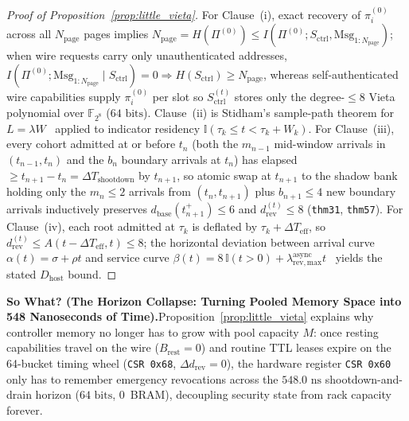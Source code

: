 \documentclass[11pt,letterpaper]{article}
\providecommand{\CoreBRAM}{0}
\theoremstyle{spectralthm}
\begin{document}
\begin{proof}[Proof of Proposition~\ref{prop:little_vieta}]
For Clause~(i), exact recovery of $\pi^{(0)}_i$ across all $N_{\mathrm{page}}$ pages implies $N_{\mathrm{page}} = H(\Pi^{(0)}) \allowbreak\le I(\Pi^{(0)};\allowbreak S_{\mathrm{ctrl}}, \mathrm{Msg}_{1:N_{\mathrm{page}}})$; when wire requests carry only unauthenticated addresses, $I(\Pi^{(0)};\allowbreak \mathrm{Msg}_{1:N_{\mathrm{page}}} \mid S_{\mathrm{ctrl}}) = 0 \allowbreak\Longrightarrow\allowbreak H(S_{\mathrm{ctrl}}) \ge N_{\mathrm{page}}$, whereas self-authenticated wire capabilities supply $\pi^{(0)}_i$ per slot so $S_{\mathrm{ctrl}}^{(t)}$ stores only the degree-$\le 8$ Vieta polynomial over $\mathbb{F}_{2^8}$ ($64\text{~bits}$). Clause~(ii) is Stidham's sample-path theorem for $L = \lambda W$~\cite{little1961proof, stidham1974sample} applied to indicator residency $\mathbb{I}(\tau_k \le t < \tau_k + W_k)$. For Clause~(iii), every cohort admitted at or before $t_n$ (both the $m_{n-1}$ mid-window arrivals in $(t_{n-1}, t_n)$ and the $b_n$ boundary arrivals at $t_n$) has elapsed $\ge t_{n+1} - t_n = \Delta T_{\mathrm{shootdown}}$ by $t_{n+1}$, so atomic swap at $t_{n+1}$ to the shadow bank holding only the $m_n \le 2$ arrivals from $(t_n, t_{n+1})$ plus $b_{n+1} \le 4$ new boundary arrivals inductively preserves $d_{\mathrm{base}}(t_{n+1}^+) \le 6$ and $d_{\mathrm{rev}}^{(t)} \le 8$ (\texttt{thm31}, \texttt{thm57}). For Clause~(iv), each root admitted at $\tau_k$ is deflated by $\tau_k + \Delta T_{\mathrm{eff}}$, so $d_{\mathrm{rev}}^{(t)} \le A(t - \Delta T_{\mathrm{eff}}, t) \le 8$; the horizontal deviation between arrival curve $\alpha(t) = \sigma + \rho t$ and service curve $\beta(t) = 8\,\mathbb{I}(t > 0) + \lambda_{\mathrm{rev,max}}^{\mathrm{async}} t$~\cite{cruz1991calculus} yields the stated $D_{\mathrm{host}}$ bound.
\end{proof}

\noindent\textbf{So What? (The Horizon Collapse: Turning Pooled Memory Space into 548 Nanoseconds of Time).}\;Proposition~\ref{prop:little_vieta} explains why controller memory no longer has to grow with pool capacity $M$: once resting capabilities travel on the wire ($B_{\mathrm{rest}}=0$) and routine TTL leases expire on the 64-bucket timing wheel (\texttt{CSR 0x68}, $\Delta d_{\mathrm{rev}}=0$), the hardware register \texttt{CSR 0x60} only has to remember emergency revocations across the $548.0\text{~ns}$ shootdown-and-drain horizon ($64\text{~bits}$, \CoreBRAM\ BRAM), decoupling security state from rack capacity forever.
\end{document}
